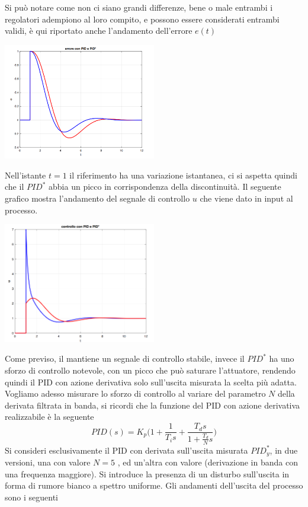 \documentclass[10pt, letterpaper]{report}
\begin{document}
Si può notare come non ci siano grandi differenze, bene o male entrambi i regolatori adempiono al loro compito, e possono essere considerati entrambi validi, è qui riportato anche l'andamento dell'errore $e(t)$
\begin{center}
    \includegraphics[width=0.5\textwidth]{images/simulazionePID2.png}
\end{center}
Nell'istante $t=1$ il riferimento ha una variazione istantanea, ci si aspetta quindi che il  \color{blue}$PID^*$ \color{black} abbia un picco in corrispondenza della discontinuità. Il seguente grafico mostra l'andamento del segnale di controllo $u$ che viene dato in input al processo.
\begin{center}
    \includegraphics[width=0.5\textwidth]{images/simulazionePID3.png}
\end{center}
Come previso, il  mantiene un segnale di controllo stabile, invece il 
\color{blue}$PID^*$ \color{black} ha uno sforzo di controllo notevole, con un picco che può saturare l'attuatore, rendendo quindi il PID con azione derivativa solo sull'uscita misurata  la scelta più adatta.\acc 
Vogliamo adesso misurare lo sforzo di controllo al variare del parametro $N$ della derivata filtrata in banda, si ricordi che la funzione del PID con azione derivativa realizzabile è la seguente
$$ PID(s)= 
K_p\Big(1+\frac{1}{T_i s}+\dfrac{T_d s}{1+\frac{T_d}{N}s}\Big)
$$
Si consideri esclusivamente il PID con derivata sull'uscita misurata $PID_y^*$, in due versioni, una con valore \color{blue}$N=5$ \color{black}, ed un'altra con valore  (derivazione in banda con una frequenza maggiore). Si introduce la presenza di un disturbo sull'uscita in forma di rumore bianco a spettro uniforme. Gli andamenti dell'uscita del processo sono i seguenti
\end{document}

